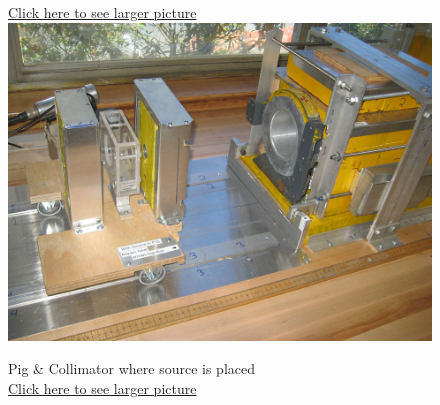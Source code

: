\documentclass{../lab}
\begin{document}
\begin{figure}[H]
{  \href{http://experimentationlab.berkeley.edu/sites/default/files/images/GMA_Pig_3536-Lg.jpg}{Click here to see larger picture}}
  \label{fig:LeadPig}
\endminipage\hfill
{}
  \href{http://experimentationlab.berkeley.edu/sites/default/files/images/GMA_Layout_3537-Lg.jpg}{\includegraphics[width=\linewidth,keepaspectratio]{images/GMA_Layout_3537-Lg.jpg}}
  \caption{Pig \& Collimator where source is placed \\ \href{http://experimentationlab.berkeley.edu/sites/default/files/images/GMA_Layout_3537-Lg.jpg}{Click here to see larger picture}}\label{fig:PigCollimator}
\endminipage
\end{figure}
\end{document}
